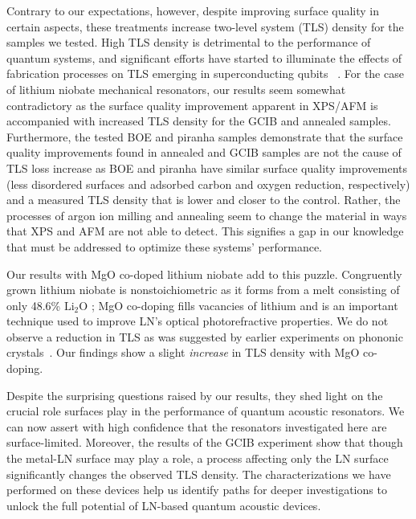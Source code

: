 \documentclass[
 prapplied,
 amsmath,amssymb,
 reprint, longbibliography, superscriptaddress
]{revtex4-2}
\begin{document}
Contrary to our expectations, however, despite improving surface quality in certain aspects, these treatments increase two-level system (TLS) density for the samples we tested. High TLS density is detrimental to the performance of quantum systems, and significant efforts have started to illuminate the effects of fabrication processes on TLS emerging in superconducting qubits~ \cite{nersisyan2019manufacturing, dunsworth2017characterization, mergenthaler2021effects}. For the case of lithium niobate mechanical resonators, our results seem somewhat contradictory as the surface quality improvement apparent in XPS/AFM is accompanied with increased TLS density for the GCIB and annealed samples. Furthermore, the tested BOE and piranha samples demonstrate that the surface quality improvements found in annealed and GCIB samples are not the cause of TLS loss increase as BOE and piranha have similar surface quality improvements (less disordered surfaces and adsorbed carbon and oxygen reduction, respectively) and a measured TLS density that is lower and closer to the control. Rather, the processes of argon ion milling and annealing seem to change the material in ways that XPS and AFM are not able to detect. This signifies a gap in our knowledge that must be addressed to optimize these systems' performance. 

Our results with MgO co-doped lithium niobate add to this puzzle. Congruently grown lithium niobate is nonstoichiometric as it forms from a melt consisting of only 48.6\% $\text{Li}_2\text{O}$ \cite{byer1970growth}; MgO co-doping fills vacancies of lithium and is an important technique used to improve LN's optical photorefractive properties. We do not observe a reduction in TLS as was suggested by earlier experiments on phononic crystals~\cite{wollack2021loss}. Our findings show a slight \emph{increase} in TLS density with MgO co-doping. 

Despite the surprising questions raised by our results, they shed light on the crucial role surfaces play in the performance of quantum acoustic resonators. We can now assert with high confidence that the resonators investigated here are surface-limited. Moreover, the results of the GCIB experiment show that though the metal-LN surface may play a role, a process affecting only the LN surface significantly changes the observed TLS density. The characterizations we have performed on these devices help us identify paths for deeper investigations to unlock the full potential of LN-based quantum acoustic devices.
\end{document}
